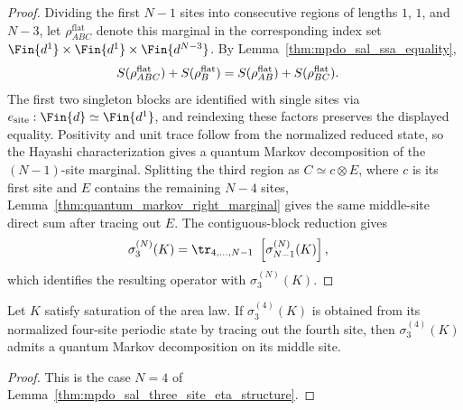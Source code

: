\begin{proof}
    \leanok
    Dividing the first $N-1$ sites into consecutive regions of lengths $1$,
    $1$, and $N-3$, let $\rho^{\mathrm{flat}}_{ABC}$ denote this marginal in
    the corresponding index set
    $\Fin{d^1}\times\Fin{d^1}\times\Fin{d^{N-3}}$.
    By Lemma~\ref{thm:mpdo_sal_ssa_equality},
    \begin{align}
        S(\rho^{\mathrm{flat}}_{ABC})+S(\rho^{\mathrm{flat}}_B)
         & =S(\rho^{\mathrm{flat}}_{AB})+S(\rho^{\mathrm{flat}}_{BC}).
        \notag
    \end{align}
    The first two singleton blocks are identified with single sites via
    $e_{\mathrm{site}}:\Fin{d}\simeq\Fin{d^1}$, and reindexing these factors
    preserves the displayed equality. Positivity and unit trace follow from
    the normalized reduced state, so the Hayashi characterization gives a
    quantum Markov decomposition of the $(N-1)$-site marginal. Splitting
    the third region as $C\simeq c\otimes E$, where $c$ is its first site and
    $E$ contains the remaining $N-4$ sites,
    Lemma~\ref{thm:quantum_markov_right_marginal} gives the same middle-site
    direct sum after tracing out $E$. The contiguous-block reduction gives
    \begin{align}
        \sigma_3^{(N)}(K)
         & =\tr_{4,\ldots,N-1}\
        \left[\sigma_{N-1}^{(N)}(K)\right],
        \notag
    \end{align}
    which identifies the resulting operator with $\sigma_3^{(N)}(K)$.
\end{proof}

\begin{lemma}
    \label{thm:mpdo_four_site_sal_eta_structure}
    \leanok
    Let $K$ satisfy saturation of the area law. If $\sigma_3^{(4)}(K)$ is obtained
    from its normalized four-site periodic state by tracing out the fourth
    site, then $\sigma_3^{(4)}(K)$ admits a quantum Markov decomposition on its
    middle site.
\end{lemma}

\begin{proof}
    \leanok
    This is the case $N=4$ of
    Lemma~\ref{thm:mpdo_sal_three_site_eta_structure}.
\end{proof}

